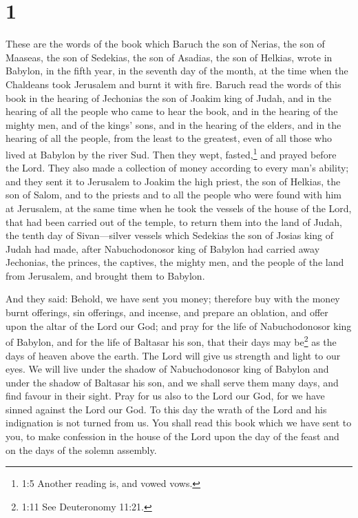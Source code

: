 \hypertarget{section}{%
\section{1}\label{section}}

 These are the words of the book which Baruch the son of
Nerias, the son of Maaseas, the son of Sedekias, the son of Asadias, the
son of Helkias, wrote in Babylon,  in the fifth year, in the
seventh day of the month, at the time when the Chaldeans took Jerusalem
and burnt it with fire.  Baruch read the words of this book
in the hearing of Jechonias the son of Joakim king of Judah, and in the
hearing of all the people who came to hear the book,  and in
the hearing of the mighty men, and of the kings' sons, and in the
hearing of the elders, and in the hearing of all the people, from the
least to the greatest, even of all those who lived at Babylon by the
river Sud.  Then they wept, fasted,\footnote{1:5 Another
  reading is, and vowed vows.} and prayed before the Lord. 
They also made a collection of money according to every man's ability;
 and they sent it to Jerusalem to Joakim the high priest,
the son of Helkias, the son of Salom, and to the priests and to all the
people who were found with him at Jerusalem,  at the same
time when he took the vessels of the house of the Lord, that had been
carried out of the temple, to return them into the land of Judah, the
tenth day of Sivan---silver vessels which Sedekias the son of Josias
king of Judah had made,  after Nabuchodonosor king of
Babylon had carried away Jechonias, the princes, the captives, the
mighty men, and the people of the land from Jerusalem, and brought them
to Babylon.

 And they said: Behold, we have sent you money; therefore
buy with the money burnt offerings, sin offerings, and incense, and
prepare an oblation, and offer upon the altar of the Lord our God;
 and pray for the life of Nabuchodonosor king of Babylon,
and for the life of Baltasar his son, that their days may be\footnote{1:11
  See Deuteronomy 11:21.} as the days of heaven above the earth.
 The Lord will give us strength and light to our eyes. We
will live under the shadow of Nabuchodonosor king of Babylon and under
the shadow of Baltasar his son, and we shall serve them many days, and
find favour in their sight.  Pray for us also to the Lord
our God, for we have sinned against the Lord our God. To this day the
wrath of the Lord and his indignation is not turned from us.
 You shall read this book which we have sent to you, to
make confession in the house of the Lord upon the day of the feast and
on the days of the solemn assembly.


